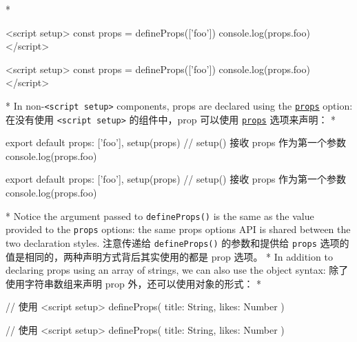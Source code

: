 \begin{paracol}{2}
\switchcolumn[0]*%
\begin{codeHtml}
<script setup>
const props = defineProps(['foo'])
console.log(props.foo)
</script>
\end{codeHtml}
\switchcolumn
\begin{codeHtml}
<script setup>
const props = defineProps(['foo'])
console.log(props.foo)
</script>
\end{codeHtml}
\switchcolumn[0]*%
In non-\texttt{\textless{}script\ setup\textgreater{}} components, props
are declared using the
\href{https://vuejs.org/api/options-state.html\#props}{\texttt{props}}
option:
\switchcolumn
在没有使用 \texttt{\textless{}script\ setup\textgreater{}}
的组件中，prop 可以使用
\href{https://cn.vuejs.org/api/options-state.html\#props}{\texttt{props}}
选项来声明：
\switchcolumn[0]*%
\begin{codeJs}
export default {
  props: ['foo'],
  setup(props) {
    // setup() 接收 props 作为第一个参数
    console.log(props.foo)
  }
}
\end{codeJs}
\switchcolumn
\begin{codeJs}
export default {
  props: ['foo'],
  setup(props) {
    // setup() 接收 props 作为第一个参数
    console.log(props.foo)
  }
}
\end{codeJs}

\switchcolumn[0]*%
Notice the argument passed to \texttt{defineProps()} is the same as the
value provided to the \texttt{props} options: the same props options API
is shared between the two declaration styles.
\switchcolumn
注意传递给 \texttt{defineProps()} 的参数和提供给 \texttt{props}
选项的值是相同的，两种声明方式背后其实使用的都是 prop 选项。
\switchcolumn[0]*%
In addition to declaring props using an array of strings, we can also
use the object syntax:
\switchcolumn
除了使用字符串数组来声明 prop 外，还可以使用对象的形式：
\switchcolumn[0]*%
\begin{codeJs}
// 使用 <script setup>
defineProps({
  title: String,
  likes: Number
})
\end{codeJs}
\switchcolumn
\begin{codeJs}
// 使用 <script setup>
defineProps({
  title: String,
  likes: Number
})
\end{codeJs}


\end{paracol}
